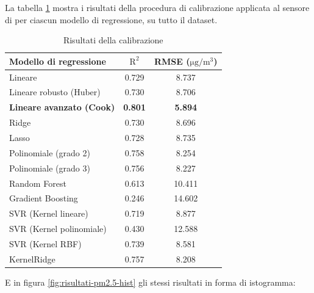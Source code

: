 La tabella \ref{fig:risultati-pm2.5} mostra i risultati della procedura di calibrazione applicata al sensore di  per ciascun modello di regressione, su tutto il dataset.

\begin{table}[H]
    \footnotesize
    \centering
    \begin{tabular}{|l|c|c|}
    \hline
        \textbf{Modello di regressione} & $\bm{\mathrm{R^2}}$ & \textbf{RMSE (}$\mathrm{\si{\micro}g/m^3}$) \\ \hline
        Lineare & 0.729 & 8.737 \\ \hline
        Lineare robusto (Huber) & 0.730 & 8.706 \\ \hline
        \textbf{Lineare avanzato (Cook)} & \textbf{0.801} & \textbf{5.894} \\ \hline
        Ridge & 0.730 & 8.696 \\ \hline
        Lasso & 0.728 & 8.735 \\ \hline
        Polinomiale (grado 2) & 0.758 & 8.254 \\ \hline
        Polinomiale (grado 3) & 0.756 & 8.227 \\ \hline
        Random Forest & 0.613 & 10.411 \\ \hline
        Gradient Boosting & 0.246 & 14.602 \\ \hline
        SVR (Kernel lineare) & 0.719 & 8.877 \\ \hline
        SVR (Kernel polinomiale) & 0.430 & 12.588 \\ \hline
        SVR (Kernel RBF) & 0.739 & 8.581 \\ \hline
        KernelRidge & 0.757 & 8.208 \\ \hline
    \end{tabular}
    \caption{Risultati della calibrazione }
    \label{fig:risultati-pm2.5}
\end{table}

E in figura \ref{fig:risultati-pm2.5-hist} gli stessi risultati in forma di istogramma:


